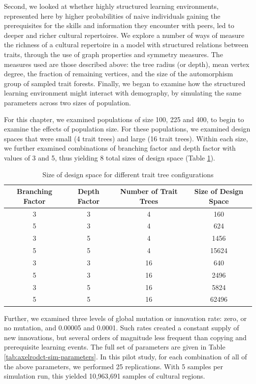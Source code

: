 Second, we looked at whether highly structured learning environments,
represented here by higher probabilities of naive individuals gaining
the prerequisites for the skills and information they encounter with
peers, led to deeper and richer cultural repertoires. We explore a
number of ways of measure the richness of a cultural repertoire in a
model with structured relations between traits, through the use of graph
properties and symmetry measures. The measures used are those described
above: the tree radius (or depth), mean vertex degree, the fraction of
remaining vertices, and the size of the automorphism group of sampled
trait forests. Finally, we began to examine how the structured learning
environment might interact with demography, by simulating the same
parameters across two sizes of population.

For this chapter, we examined populations of size 100, 225 and 400, to
begin to examine the effects of population size. For these populations,
we examined design spaces that were small (4 trait trees) and large (16
trait trees). Within each size, we further examined combinations of
branching factor and depth factor with values of 3 and 5, thus yielding
8 total sizes of design space (Table
\ref{tab:axelrod-design-space-size}).

\begin{table}[H]
\begin{tabular}{|c|c|c|c|}
\hline
\textbf{Branching Factor} & \textbf{Depth Factor} & \textbf{Number of Trait Trees} & \textbf{Size of Design Space}\\ 
\hline
3 & 3 & 4 & 160\\ 
\hline 
5 & 3 & 4 & 624\\ 
\hline 
3 & 5 & 4 & 1456\\ 
\hline 
5 & 5 & 4 & 15624\\ 
\hline 
3 & 3 & 16 & 640\\ 
\hline 
5 & 3 & 16 & 2496\\ 
\hline 
3 & 5 & 16 & 5824\\ 
\hline 
5 & 5 & 16 & 62496\\ 
\hline 
\hline
\end{tabular}
\caption{Size of design space for different trait tree configurations}
\label{tab:axelrod-design-space-size}
\end{table}

Further, we examined three levels of global mutation or innovation rate:
zero, or no mutation, and 0.00005 and 0.0001. Such rates created a
constant supply of new innovations, but several orders of magnitude less
frequent than copying and prerequisite learning events. The full set of
parameters are given in Table \ref{tab:axelrodct-sim-parameters}. In
this pilot study, for each combination of all of the above parameters,
we performed 25 replications. With 5 samples per simulation run, this
yielded 10,963,691 samples of cultural regions.

